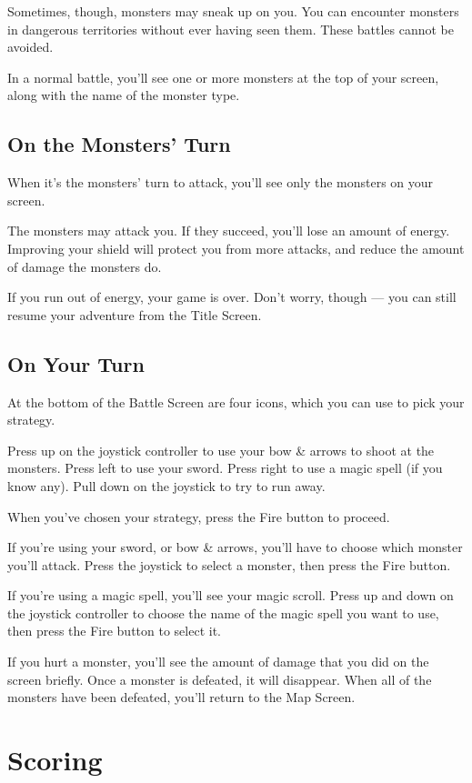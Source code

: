 \documentclass[10pt,twoside,openright]{memoir}
\begin{document}
Sometimes, though, monsters may sneak up on you. You can encounter
monsters in dangerous territories without ever having seen them. These
battles cannot be avoided.

In a normal battle, you'll see one or more monsters at the top of your
screen, along with the name of the monster type.

\subsection{On the Monsters' Turn}

When it's the monsters' turn to attack, you'll see only the monsters
on your screen.

The monsters may attack you. If they succeed, you'll lose an amount of
energy. Improving your shield will protect you from more attacks, and
reduce the amount of damage the monsters do.

If you run out of energy, your game is over. Don't worry, though ---
you can still resume your adventure from the Title Screen.

\subsection{On Your Turn}

At the bottom of the Battle Screen are four icons, which you can use
to pick your strategy.

Press up on the joystick controller to use your bow \& arrows to shoot
at the monsters. Press left to use your sword. Press right to use a
magic spell (if you know any). Pull down on the joystick to try to run
away.

When you've chosen your strategy, press the Fire button to proceed.

If you're using your sword, or bow \& arrows, you'll have to choose
which monster you'll attack. Press the joystick to select a monster,
then press the Fire button.

If you're using a magic spell, you'll see your magic scroll. Press up
and down on the joystick controller to choose the name of the magic
spell you want to use, then press the Fire button to select it.

If you hurt a monster, you'll see the amount of damage that you did on
the   screen  briefly.   Once   a  monster   is   defeated,  it   will
disappear. When all of the  monsters have been defeated, you'll return
to the Map Screen.

\section{Scoring}
\end{document}
